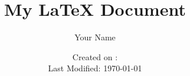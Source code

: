 \title{My LaTeX Document}
\author{Your Name}
\usepackage[en-US]{datetime2}

\newcommand{\CreateDate}{}

\date{
    Created on : \CreateDate \\
    Last Modified: \today}